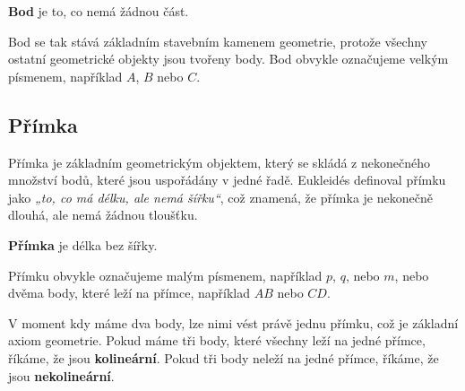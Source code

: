 \documentclass[12pt,a4paper]{article}
\begin{document}
\begin{definitionbox}
    \textbf{Bod} je to, co nemá žádnou část.
\end{definitionbox}

Bod se tak stává základním stavebním kamenem geometrie, protože všechny ostatní geometrické objekty jsou tvořeny body.
Bod obvykle označujeme velkým písmenem, například \(A\), \(B\) nebo \(C\).

\begin{center}
\end{center}


\subsection{Přímka}
Přímka je základním geometrickým objektem, který se skládá z nekonečného množství bodů, které jsou uspořádány v jedné řadě. 
Eukleidés definoval přímku jako \emph{„to, co má délku, ale nemá šířku“}, což znamená, že přímka je nekonečně dlouhá, ale nemá žádnou tloušťku.

\begin{definitionbox}
    \textbf{Přímka} je délka bez šířky.
\end{definitionbox}

Přímku obvykle označujeme malým písmenem, například \(p\), \(q\), nebo \(m\), nebo dvěma body, které leží na přímce, například \(AB\) nebo \(CD\).

\begin{center}
\end{center}

V moment kdy máme dva body, lze nimi vést právě jednu přímku, což je základní axiom geometrie.
Pokud máme tři body, které všechny leží na jedné přímce, říkáme, že jsou \textbf{kolineární}. Pokud tři body neleží na jedné přímce, říkáme, že jsou \textbf{nekolineární}.
\end{document}
